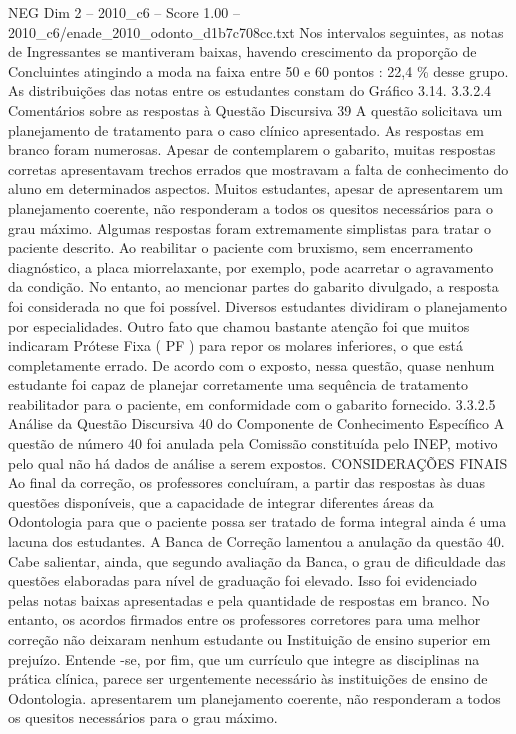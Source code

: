 \begin{textsample}{NEG Dim 2 – 2010\_c6 – Score 1.00 – 2010\_c6/enade\_2010\_odonto\_d1b7c708cc.txt}
Nos intervalos seguintes, as notas de Ingressantes se mantiveram baixas, havendo crescimento da proporção de Concluintes atingindo a moda na faixa entre 50 e 60 pontos : 22,4 \% desse grupo.
As distribuições das notas entre os estudantes constam do Gráfico 3.14. 3.3.2.4 Comentários sobre as respostas à Questão Discursiva 39 A questão solicitava um planejamento de tratamento para o caso clínico apresentado.
As respostas em branco foram numerosas.
Apesar de contemplarem o gabarito, muitas respostas corretas apresentavam trechos errados que mostravam a falta de conhecimento do aluno em determinados aspectos.
Muitos estudantes, apesar de apresentarem um planejamento coerente, não responderam a todos os quesitos necessários para o grau máximo.
Algumas respostas foram extremamente simplistas para tratar o paciente descrito.
Ao reabilitar o paciente com bruxismo, sem encerramento diagnóstico, a placa miorrelaxante, por exemplo, pode acarretar o agravamento da condição.
No entanto, ao mencionar partes do gabarito divulgado, a resposta foi considerada no que foi possível.
Diversos estudantes dividiram o planejamento por especialidades.
Outro fato que chamou bastante atenção foi que muitos indicaram Prótese Fixa ( PF ) para repor os molares inferiores, o que está completamente errado.
De acordo com o exposto, nessa questão, quase nenhum estudante foi capaz de planejar corretamente uma sequência de tratamento reabilitador para o paciente, em conformidade com o gabarito fornecido. 3.3.2.5 Análise da Questão Discursiva 40 do Componente de Conhecimento Específico A questão de número 40 foi anulada pela Comissão constituída pelo INEP, motivo pelo qual não há dados de análise a serem expostos.
CONSIDERAÇÕES FINAIS Ao final da correção, os professores concluíram, a partir das respostas às duas questões disponíveis, que a capacidade de integrar diferentes áreas da Odontologia para que o paciente possa ser tratado de forma integral ainda é uma lacuna dos estudantes.
A Banca de Correção lamentou a anulação da questão 40.
Cabe salientar, ainda, que segundo avaliação da Banca, o grau de dificuldade das questões elaboradas para nível de graduação foi elevado.
Isso foi evidenciado pelas notas baixas apresentadas e pela quantidade de respostas em branco.
No entanto, os acordos firmados entre os professores corretores para uma melhor correção não deixaram nenhum estudante ou Instituição de ensino superior em prejuízo.
Entende -se, por fim, que um currículo que integre as disciplinas na prática clínica, parece ser urgentemente necessário às instituições de ensino de Odontologia. apresentarem um planejamento coerente, não responderam a todos os quesitos necessários para o grau máximo.

\end{textsample}
